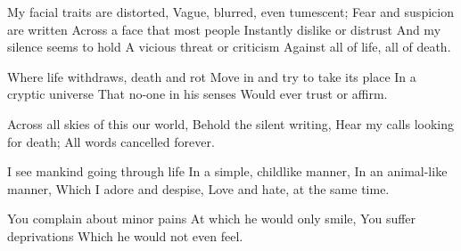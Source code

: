 \documentclass{article}
\newenvironment{stanza}{\begin{minipage}{10cm}\obeylines}{\end{minipage}\vspace{\baselineskip}}
\begin{document}
\begin{stanza}
My facial traits are distorted,
Vague, blurred, even tumescent;
Fear and suspicion are written
Across a face that most people
Instantly dislike or distrust
And my silence seems to hold
A vicious threat or criticism
Against all of life, all of death.
\end{stanza}

\begin{stanza}
Where life withdraws, death and rot
Move in and try to take its place
In a cryptic universe
That no-one in his senses
Would ever trust or affirm.
\end{stanza}

\begin{stanza}
Across all skies of this our world,
Behold the silent writing,
Hear my calls looking for death;
All words cancelled forever.
\end{stanza}


\begin{stanza}
I see mankind going through life
In a simple, childlike manner,
In an animal-like manner,
Which I adore and despise,
Love and hate, at the same time.
\end{stanza}

\begin{stanza}
You complain about minor pains
At which he would only smile,
You suffer deprivations
Which he would not even feel.
\end{stanza}

\end{document}
